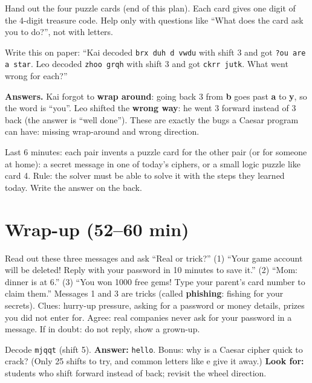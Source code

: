 Hand out the four puzzle cards (end of this plan). Each card gives one digit of the 4-digit treasure code. Help only with questions like
\enquote{What does the card ask you to do?}, not with letters.

\begin{bughunt}
Write this on paper: \enquote{Kai decoded \texttt{brx duh d vwdu} with shift 3 and got \texttt{?ou are a star}. Leo decoded \texttt{zhoo grqh} with
shift 3 and got \texttt{ckrr jutk}. What went wrong for each?}
\par\textbf{Answers.} Kai forgot to \textbf{wrap around}: going back 3 from \textbf{b} goes past \textbf{a} to \textbf{y}, so the word is \enquote{you}.
Leo shifted the \textbf{wrong way}: he went 3 forward instead of 3 back (the answer is \enquote{well done}). These are exactly the bugs a
Caesar program can have: missing wrap-around and wrong direction.
\end{bughunt}

\begin{freebuild}
Last 6 minutes: each pair invents a puzzle card for the other pair (or for someone at home): a secret message in one of today's ciphers,
or a small logic puzzle like card 4. Rule: the solver must be able to solve it with the steps they learned today. Write the answer on the back.
\end{freebuild}

\section{Wrap-up (52--60 min)}
\begin{safety}
Read out these three messages and ask \enquote{Real or trick?}
(1) \enquote{Your game account will be deleted! Reply with your password in 10 minutes to save it.}
(2) \enquote{Mom: dinner is at 6.}
(3) \enquote{You won 1000 free gems! Type your parent's card number to claim them.}
Messages 1 and 3 are tricks (called \textbf{phishing}: fishing for your secrets). Clues: hurry-up pressure, asking for a password or money details,
prizes you did not enter for. Agree: real companies never ask for your password in a message. If in doubt: do not reply, show a grown-up.
\end{safety}

\begin{formativecheck}
Decode \texttt{mjqqt} (shift 5). \textbf{Answer:} \texttt{hello}. Bonus: why is a Caesar cipher quick to crack?
(Only 25 shifts to try, and common letters like e give it away.)
\textbf{Look for:} students who shift forward instead of back; revisit the wheel direction.
\end{formativecheck}

